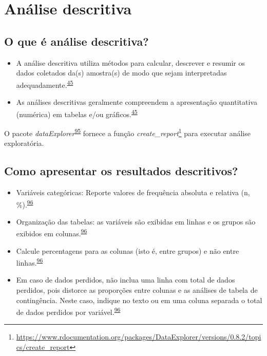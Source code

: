 \documentclass[
  a4paper,
]{book}
\renewcommand{\href}[2]{#2\footnote{\url{#1}}}
\newenvironment{infobox}[1]
  {
  \begin{itemize}
  \renewcommand{\labelitemi}{
    \raisebox{-.7\height}[0pt][0pt]{
      {\setkeys{Gin}{width=3em,keepaspectratio}
        \texttt{[image: \#1]}}
    }
  }
  \setlength{\fboxsep}{1em}
  \begin{blackbox}
  \item
  }
  {
  \end{blackbox}
  \end{itemize}
  }
\begin{document}
\hypertarget{descritiva}{%
\section{Análise descritiva}\label{descritiva}}

\hypertarget{o-que-uxe9-anuxe1lise-descritiva}{%
\subsection{O que é análise descritiva?}\label{o-que-uxe9-anuxe1lise-descritiva}}

\begin{itemize}
\item
  A análise descritiva utiliza métodos para calcular, descrever e resumir os dados coletados da(s) amostra(s) de modo que sejam interpretadas adequadamente.\textsuperscript{\protect\hyperlink{ref-vetter2017}{45}}
\item
  As análises descritivas geralmente compreendem a apresentação quantitativa (numérica) em tabelas e/ou gráficos.\textsuperscript{\protect\hyperlink{ref-vetter2017}{45}}
\end{itemize}

\begin{infobox}{images/Rlogo}
O pacote \emph{dataExplorer}\textsuperscript{\protect\hyperlink{ref-DataExplorer}{95}} fornece a função \href{https://www.rdocumentation.org/packages/DataExplorer/versions/0.8.2/topics/create_report}{\emph{create\_report}} para executar análise exploratória.

\end{infobox}

\hypertarget{como-apresentar-os-resultados-descritivos}{%
\subsection{Como apresentar os resultados descritivos?}\label{como-apresentar-os-resultados-descritivos}}

\begin{itemize}
\item
  Variáveis categóricas: Reporte valores de frequência absoluta e relativa (n, \%).\textsuperscript{\protect\hyperlink{ref-Cummings2003}{96}}
\item
  Organização das tabelas: as variáveis são exibidas em linhas e os grupos são exibidos em colunas.\textsuperscript{\protect\hyperlink{ref-Cummings2003}{96}}
\item
  Calcule percentagens para as colunas (isto é, entre grupos) e não entre linhas.\textsuperscript{\protect\hyperlink{ref-Cummings2003}{96}}
\item
  Em caso de dados perdidos, não inclua uma linha com total de dados perdidos, pois distorce as proporções entre colunas e as análises de tabela de contingência. Neste caso, indique no texto ou em uma coluna separada o total de dados perdidos por variável.\textsuperscript{\protect\hyperlink{ref-Cummings2003}{96}}
\end{itemize}
\end{document}
